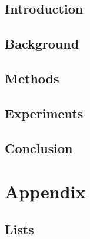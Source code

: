\documentclass  [
paper    = a4,
BCOR     = 10mm,
twoside,
fontsize = 12pt,
toc      = bibnumbered,
toc      = listofnumbered,
numbers  = noendperiod,
headings = normal,
listof   = leveldown,
version  = 3.03
]                                       {scrreprt}
\begin{document}
	
	
	\tableofcontents
	
	\chapter{Introduction}
	
	\chapter{Background}
	
	
	\chapter{Methods}
	
	
	
	
	
	
	\chapter{Experiments}
	
	
	
	
	\chapter{Conclusion}
	
	
	
	\part{Appendix}
	\begin{appendix}
		
		
		\chapter{Lists}
		\listoffigures
		\listoftables
		
		
		
	\end{appendix}
\end{document}
